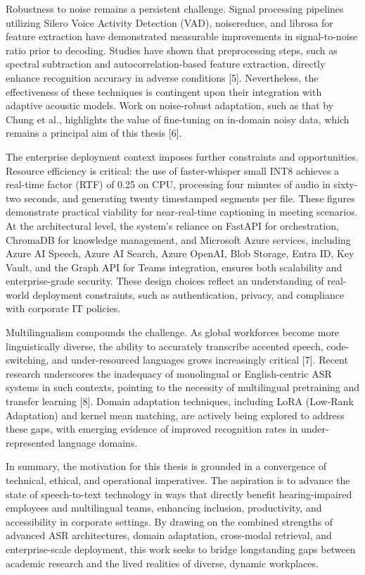 \documentclass[12pt,a4paper]{article}
\begin{document}
Robustness to noise remains a persistent challenge. Signal processing pipelines utilizing Silero Voice Activity Detection (VAD), noisereduce, and librosa for feature extraction have demonstrated measurable improvements in signal-to-noise ratio prior to decoding. Studies have shown that preprocessing steps, such as spectral subtraction and autocorrelation-based feature extraction, directly enhance recognition accuracy in adverse conditions [5]. Nevertheless, the effectiveness of these techniques is contingent upon their integration with adaptive acoustic models. Work on noise-robust adaptation, such as that by Chung et al., highlights the value of fine-tuning on in-domain noisy data, which remains a principal aim of this thesis [6].


The enterprise deployment context imposes further constraints and opportunities. Resource efficiency is critical: the use of faster-whisper small INT8 achieves a real-time factor (RTF) of 0.25 on CPU, processing four minutes of audio in sixty-two seconds, and generating twenty timestamped segments per file. These figures demonstrate practical viability for near-real-time captioning in meeting scenarios. At the architectural level, the system’s reliance on FastAPI for orchestration, ChromaDB for knowledge management, and Microsoft Azure services, including Azure AI Speech, Azure AI Search, Azure OpenAI, Blob Storage, Entra ID, Key Vault, and the Graph API for Teams integration, ensures both scalability and enterprise-grade security. These design choices reflect an understanding of real-world deployment constraints, such as authentication, privacy, and compliance with corporate IT policies.


Multilingualism compounds the challenge. As global workforces become more linguistically diverse, the ability to accurately transcribe accented speech, code-switching, and under-resourced languages grows increasingly critical [7]. Recent research underscores the inadequacy of monolingual or English-centric ASR systems in such contexts, pointing to the necessity of multilingual pretraining and transfer learning [8]. Domain adaptation techniques, including LoRA (Low-Rank Adaptation) and kernel mean matching, are actively being explored to address these gaps, with emerging evidence of improved recognition rates in under-represented language domains.


In summary, the motivation for this thesis is grounded in a convergence of technical, ethical, and operational imperatives. The aspiration is to advance the state of speech-to-text technology in ways that directly benefit hearing-impaired employees and multilingual teams, enhancing inclusion, productivity, and accessibility in corporate settings. By drawing on the combined strengths of advanced ASR architectures, domain adaptation, cross-modal retrieval, and enterprise-scale deployment, this work seeks to bridge longstanding gaps between academic research and the lived realities of diverse, dynamic workplaces.
\end{document}
